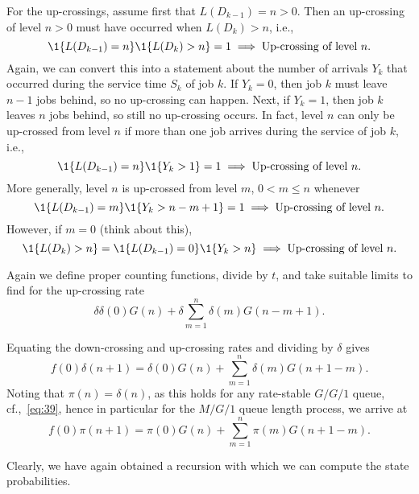 For the up-crossings, assume first that $L(D_{k-1})=n>0$. Then an up-crossing of level $n>0$ must have occurred when $L(D_k)>n$, i.e., 
 \begin{equation*}
 \1{L(D_{k-1}) = n}\1{L(D_k)>n} = 1 \implies \text{Up-crossing of level $n$}.
 \end{equation*}
Again, we can convert this into a statement about the number of
arrivals $Y_k$ that occurred during the service time $S_k$ of job $k$. If $Y_k=0$, then
job $k$ must leave $n-1$ jobs behind, so no up-crossing can
happen. Next, if $Y_k=1$, then job $k$ leaves $n$ jobs behind, so
still no up-crossing occurs. In fact, level $n$ can only be up-crossed from level $n$ if
more than one job arrives during the service of job $k$, i.e.,
\begin{equation*}
\1{L(D_{k-1})=n} \1{Y_{k}>1} = 1 \implies \text{Up-crossing of level $n$}.
\end{equation*}
More generally, level $n$ is up-crossed from level $m$, $0<m\leq n$ whenever
\begin{equation*}
\1{L(D_{k-1})=m} \1{Y_{k}>n-m+1} = 1 \implies \text{Up-crossing of level $n$}.
\end{equation*}
However, if $m=0$ (think about this),
\begin{equation*}
\1{L(D_{k})>n} = \1{L(D_{k-1})=0} \1{Y_{k}>n} \implies \text{Up-crossing of level $n$}.
\end{equation*}

Again we define proper counting functions, divide by $t$, and take suitable limits to find for the up-crossing rate
\begin{equation}\label{eq:555}
\delta \delta(0) G(n) + \delta \sum_{m=1}^n \delta(m) G(n-m+1).
\end{equation}


Equating the down-crossing and up-crossing rates and dividing
by $\delta$ gives
\begin{equation*}
 f(0) \delta(n+1) = \delta(0) G(n) + \sum_{m=1}^{n} \delta(m) G(n+1-m).
\end{equation*}
Noting that $\pi(n) = \delta(n)$, as this holds for any rate-stable $G/G/1$ queue, cf.,~\cref{eq:39}, hence in particular for the $M/G/1$ queue length process, we arrive at
\begin{equation}\label{eq:72}
 f(0) \pi(n+1) = \pi(0) G(n) + \sum_{m=1}^{n} \pi(m) G(n+1-m).
\end{equation}

Clearly, we have again obtained a recursion with which we can compute the state probabilities. 



